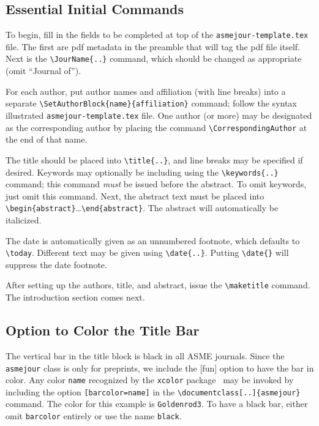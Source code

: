 \documentclass[balance,nocopyright,upint,varvw,hyphenate,barcolor=Goldenrod3,german]{asmejour}%
\begin{document}
\subsection{Essential Initial Commands}
To begin, fill in the fields to be completed at top of the \texttt{asmejour-template.tex} file. The first are pdf metadata in the preamble that will tag the pdf file itself. Next is the \verb|\JourName{..}| command, which should be changed as appropriate (omit ``Journal of'').

For each author, put author names and affiliation (with line breaks) into a separate \verb|\SetAuthorBlock{name}{affiliation}| command; follow the syntax illustrated \texttt{asmejour-template.tex} file.  One author (or more) may be designated as the corresponding author  by placing the command \verb|\CorrespondingAuthor| at the end of that name.  

The title should be placed into \verb|\title{..}|, and line breaks may be specified if desired. Keywords may optionally be including using the \verb|\keywords{..}| command; this command \emph{must} be issued before the abstract. To omit keywords, just omit this command. Next, the abstract text must be placed into \verb|\begin{abstract}|\ldots\verb|\end{abstract}|. The abstract will automatically be italicized. 

The date is automatically given as an unnumbered footnote, which defaults to \verb|\today|. Different text may be given using \verb|\date{..}|. Putting \verb|\date{}| will suppress the date footnote.

After setting up the authors, title, and abstract, issue the \verb|\maketitle| command. The introduction section comes next. 

\subsection{Option to Color the Title Bar}
The vertical bar in the title block is black in all ASME journals. Since the \texttt{asmejour} class is only for preprints, we include the [fun] option to have the bar in color. Any color \texttt{name} recognized by the \texttt{xcolor} package~\cite{kern} may be invoked by including the option \texttt{[barcolor=name]} in the \verb|\documentclass[..]{asmejour}| command. The color for this example is \texttt{Goldenrod3}. To have a black bar, either omit \texttt{barcolor} entirely or use the name \texttt{black}.
\end{document}
